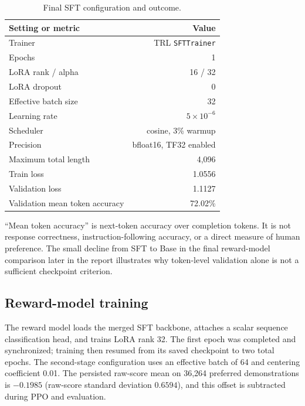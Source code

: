 \documentclass[11pt]{article}
\newcommand{\trl}{\textsc{TRL}}
\begin{document}
\begin{table}[H]
\centering
\caption{Final SFT configuration and outcome.}
\label{tab:sft}
\begin{tabularx}{0.88\textwidth}{@{}Y r@{}}
\toprule
\textbf{Setting or metric} & \textbf{Value}\\
\midrule
Trainer & \trl{} \texttt{SFTTrainer}\\
Epochs & 1\\
LoRA rank / alpha & 16 / 32\\
LoRA dropout & 0\\
Effective batch size & 32\\
Learning rate & $5\times 10^{-6}$\\
Scheduler & cosine, 3\% warmup\\
Precision & bfloat16, TF32 enabled\\
Maximum total length & 4,096\\
Train loss & 1.0556\\
Validation loss & 1.1127\\
Validation mean token accuracy & 72.02\%\\
\bottomrule
\end{tabularx}
\end{table}

``Mean token accuracy'' is next-token accuracy over completion tokens. It is
not response correctness, instruction-following accuracy, or a direct measure
of human preference. The small decline from SFT to Base in the final
reward-model comparison later in the report illustrates why token-level
validation alone is not a sufficient checkpoint criterion.

\subsection{Reward-model training}

The reward model loads the merged SFT backbone, attaches a scalar sequence
classification head, and trains LoRA rank 32. The first epoch was completed
and synchronized; training then resumed from its saved checkpoint to two total
epochs. The second-stage configuration uses an effective batch of 64 and
centering coefficient 0.01. The persisted raw-score mean on 36,264 preferred
demonstrations is $-0.1985$ (raw-score standard deviation $0.6594$), and this
offset is subtracted during PPO and evaluation.
\end{document}
